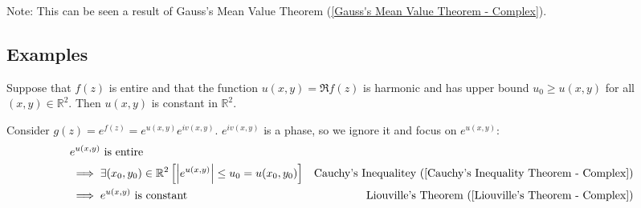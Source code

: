 \documentclass[12pt, english]{book}
\makeatletter
\renewenvironment{proof}[1][\proofname]{\par
	\pushQED{\qed}%
	\normalfont \topsep6\p@\@plus6\p@\relax
	\list{}{%
		\settowidth{\leftmargin}{\itshape\proofname:\hskip\labelsep}%
		\setlength{\labelwidth}{0pt}%
		\setlength{\itemindent}{-\leftmargin}%
	}%
	\item[\hskip\labelsep\itshape#1\@addpunct{:}]\ignorespaces
	}{ \popQED\endlist\@endpefalse}
\makeatother
\begin{document}
	Note: This can be seen a result of Gauss's Mean Value Theorem (\cref{Gauss's Mean Value Theorem - Complex}).

	\subsection{Examples} \label{Maximum Modulus Principle Examples Subsection - Complex}
	
	\begin{example}
		Suppose that \(f(z)\) is entire and that the function \(u(x,y) = \Re{f(z)}\) is harmonic and has upper bound \(u_0 \geq u(x,y)\) for all \((x,y) \in \mathbb{R}^2\). Then \(u(x,y)\) is constant in \(\mathbb{R}^2\).
		\begin{proof}
			{\color{Grey}
				Consider \(g(z) = e^{f(z)} = e^{u(x,y)}  e^{iv(x,y)}\). \(e^{iv(x,y)}\) is a phase, so we ignore it and focus on \(e^{u(x,y)}\):
				\begin{align*}
					&e^{u(x,y)} \text{ is entire} \\
					&\implies \exists(x_0, y_0) \in \mathbb{R}^2
					\left[\abs{e^{u(x,y)}} \leq u_0 = u(x_0, y_0) \right] 
					& \text{Cauchy's Inequalitey } (\Cref{Cauchy's Inequality Theorem - Complex}) \\
					&\implies  e^{u(x,y)} \text{ is constant}
					& \text{Liouville's Theorem } (\Cref{Liouville's Theorem - Complex})
				\end{align*}
			}
		\end{proof}
	\end{example}
\end{document}
